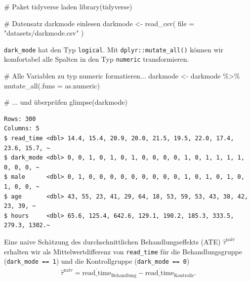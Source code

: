 \documentclass[
  a4paper,
  DIV=11,
  oneside]{scrreprt}
\newenvironment{Shaded}{\begin{snugshade}}{\end{snugshade}}
\newcommand{\AttributeTok}[1]{\textcolor[rgb]{0.40,0.45,0.13}{#1}}
\newcommand{\CommentTok}[1]{\textcolor[rgb]{0.37,0.37,0.37}{#1}}
\newcommand{\FunctionTok}[1]{\textcolor[rgb]{0.28,0.35,0.67}{#1}}
\newcommand{\NormalTok}[1]{\textcolor[rgb]{0.00,0.23,0.31}{#1}}
\newcommand{\OtherTok}[1]{\textcolor[rgb]{0.00,0.23,0.31}{#1}}
\newcommand{\SpecialCharTok}[1]{\textcolor[rgb]{0.37,0.37,0.37}{#1}}
\newcommand{\StringTok}[1]{\textcolor[rgb]{0.13,0.47,0.30}{#1}}
\begin{document}
\begin{Shaded}
\begin{Highlighting}[]
\CommentTok{\# Paket \textasciigrave{}tidyverse\textasciigrave{} laden}
\FunctionTok{library}\NormalTok{(tidyverse)}

\CommentTok{\# Datensatz \textquotesingle{}darkmode\textquotesingle{} einlesen}
\NormalTok{darkmode }\OtherTok{\textless{}{-}} \FunctionTok{read\_csv}\NormalTok{(}
  \AttributeTok{file =} \StringTok{"datasets/darkmode.csv"}
\NormalTok{)}
\end{Highlighting}
\end{Shaded}

\texttt{dark\_mode} hat den Typ \texttt{logical}. Mit
\texttt{dplyr::mutate\_all()} können wir komfortabel alle Spalten in den
Typ \texttt{numeric} transformieren.

\begin{Shaded}
\begin{Highlighting}[]
\CommentTok{\# Alle Variablen zu typ \textquotesingle{}numeric\textquotesingle{} formatieren...}
\NormalTok{darkmode }\OtherTok{\textless{}{-}}\NormalTok{ darkmode }\SpecialCharTok{\%\textgreater{}\%} 
  \FunctionTok{mutate\_all}\NormalTok{(}\AttributeTok{.funs =}\NormalTok{ as.numeric)}

\CommentTok{\# ... und überprüfen}
\FunctionTok{glimpse}\NormalTok{(darkmode)}
\end{Highlighting}
\end{Shaded}

\begin{verbatim}
Rows: 300
Columns: 5
$ read_time <dbl> 14.4, 15.4, 20.9, 20.0, 21.5, 19.5, 22.0, 17.4, 23.6, 15.7, ~
$ dark_mode <dbl> 0, 0, 1, 0, 1, 0, 1, 0, 0, 0, 0, 1, 0, 1, 1, 1, 1, 0, 0, 0, ~
$ male      <dbl> 0, 1, 0, 0, 0, 0, 0, 0, 0, 0, 0, 1, 0, 1, 0, 1, 0, 1, 0, 0, ~
$ age       <dbl> 43, 55, 23, 41, 29, 64, 18, 53, 59, 53, 43, 38, 42, 23, 39, ~
$ hours     <dbl> 65.6, 125.4, 642.6, 129.1, 190.2, 185.3, 333.5, 279.3, 1302.~
\end{verbatim}

Eine naive Schätzung des durchschnittlichen Behandlungseffekts (ATE)
\(\widehat{\tau}^{\text{naiv}}\) erhalten wir als Mittelwertdifferenz
von \texttt{read\_time} für die Behandlungsgruppe
(\texttt{dark\_mode\ ==\ 1}) und die Kontrollgruppe
(\texttt{dark\_mode\ ==\ 0}) \begin{align}
  \widehat{\tau}^{\text{naiv}} = \overline{\text{read\_time}}_{\text{Behandlung}} - \overline{\text{read\_time}}_{\text{Kontrolle}}.\label{eq:naivATEdarkmode}
\end{align}
\end{document}
